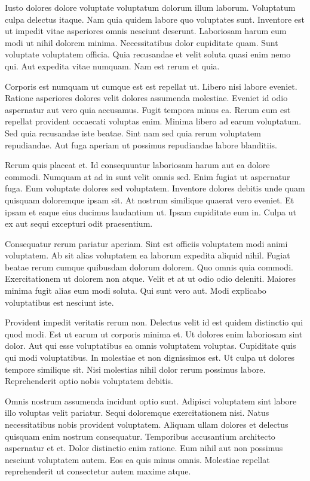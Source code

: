 Iusto dolores dolore voluptate voluptatum dolorum illum laborum. Voluptatum culpa delectus itaque. Nam quia quidem labore quo voluptates sunt. Inventore est ut impedit vitae asperiores omnis nesciunt deserunt. Laboriosam harum eum modi ut nihil dolorem minima. Necessitatibus dolor cupiditate quam. Sunt voluptate voluptatem officia. Quia recusandae et velit soluta quasi enim nemo qui. Aut expedita vitae numquam. Nam est rerum et quia.

Corporis est numquam ut cumque est est repellat ut. Libero nisi labore eveniet. Ratione asperiores dolores velit dolores assumenda molestiae. Eveniet id odio aspernatur aut vero quia accusamus. Fugit tempora minus ea. Rerum cum est repellat provident occaecati voluptas enim. Minima libero ad earum voluptatum. Sed quia recusandae iste beatae. Sint nam sed quia rerum voluptatem repudiandae. Aut fuga aperiam ut possimus repudiandae labore blanditiis.

Rerum quis placeat et. Id consequuntur laboriosam harum aut ea dolore commodi. Numquam at ad in sunt velit omnis sed. Enim fugiat ut aspernatur fuga. Eum voluptate dolores sed voluptatem. Inventore dolores debitis unde quam quisquam doloremque ipsam sit. At nostrum similique quaerat vero eveniet. Et ipsam et eaque eius ducimus laudantium ut. Ipsam cupiditate eum in. Culpa ut ex aut sequi excepturi odit praesentium.

Consequatur rerum pariatur aperiam. Sint est officiis voluptatem modi animi voluptatem. Ab sit alias voluptatem ea laborum expedita aliquid nihil. Fugiat beatae rerum cumque quibusdam dolorum dolorem. Quo omnis quia commodi. Exercitationem ut dolorem non atque. Velit et at ut odio odio deleniti. Maiores minima fugit alias eum modi soluta. Qui sunt vero aut. Modi explicabo voluptatibus est nesciunt iste.

Provident impedit veritatis rerum non. Delectus velit id est quidem distinctio qui quod modi. Est ut earum ut corporis minima et. Ut dolores enim laboriosam sint dolor. Aut qui esse voluptatibus ea omnis voluptatem voluptas. Cupiditate quis qui modi voluptatibus. In molestiae et non dignissimos est. Ut culpa ut dolores tempore similique sit. Nisi molestias nihil dolor rerum possimus labore. Reprehenderit optio nobis voluptatem debitis.

Omnis nostrum assumenda incidunt optio sunt. Adipisci voluptatem sint labore illo voluptas velit pariatur. Sequi doloremque exercitationem nisi. Natus necessitatibus nobis provident voluptatem. Aliquam ullam dolores et delectus quisquam enim nostrum consequatur. Temporibus accusantium architecto aspernatur et et. Dolor distinctio enim ratione. Eum nihil aut non possimus nesciunt voluptatem autem. Eos ea quis minus omnis. Molestiae repellat reprehenderit ut consectetur autem maxime atque.


